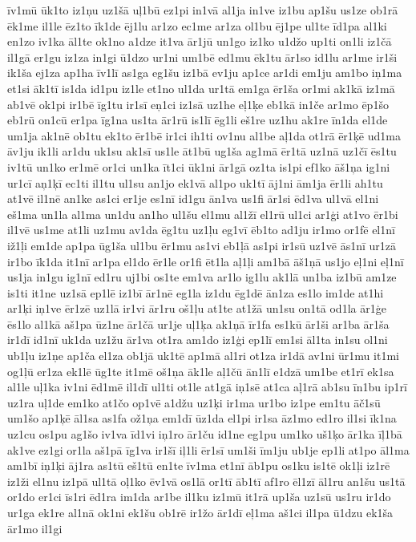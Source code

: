 {īv1mū
ūk1to
iz1ņu
uz1šā
uļ1bū
ez1pi
in1vā
al1ja
in1ve
iz1bu
ap1šu
us1ze
ob1rā
ēk1me
il1le
ēz1to
īk1de
ēj1lu
ar1zo
ec1me
ar1za
ol1bu
ēj1pe
ul1te
īd1pa
al1ki
en1zo
iv1ka
āl1te
ok1no
a1dze
it1va
ār1jū
un1go
iz1ko
u1džo
up1ti
on1li
iz1čā
il1gā
er1gu
iz1za
in1gi
ū1dzo
ur1ni
um1bē
ed1mu
ēk1tu
ār1so
id1lu
ar1me
ir1ši
ik1ša
ej1za
ap1ha
īv1lī
as1ga
eg1šu
iz1bā
ev1ju
ap1ce
ar1di
em1ju
am1bo
iņ1ma
et1si
āk1tī
is1da
id1pu
iz1le
et1no
ul1da
ur1tā
em1ga
ēr1ša
or1mi
ak1kā
iz1mā
ab1vē
ok1pi
ir1bē
īg1tu
ir1sī
eņ1ci
iz1sā
uz1he
eļ1ķe
eb1kā
in1če
ar1mo
ēp1šo
eb1rū
on1cū
er1pa
īg1na
us1ta
ār1rū
is1lī
ēg1li
eš1re
uz1hu
ak1re
īn1da
el1de
um1ja
ak1nē
ob1tu
ek1to
ēr1bē
ir1ci
ih1ti
ov1nu
al1be
aļ1da
ot1rā
ēr1ķē
ud1ma
āv1ju
ik1li
ar1du
uk1su
ak1sī
us1le
āt1bū
ug1ša
ag1mā
ēr1tā
uz1nā
uz1čī
ēs1tu
iv1tū
un1ko
er1mē
or1ci
un1ka
īt1ci
ūk1ni
ār1gā
oz1ta
is1pi
ef1ko
āš1ņa
ig1ni
ur1cī
aņ1ķī
ec1ti
il1tu
ul1su
an1jo
ek1vā
al1po
uk1tī
āj1ni
ām1ja
ēr1li
ah1tu
at1vē
il1nē
an1ke
as1ci
er1je
es1nī
id1gu
ān1va
us1fi
ār1si
ēd1va
ul1vā
el1ni
eš1ma
un1la
al1ma
un1du
an1ho
ul1šu
el1mu
al1žī
el1rū
ul1ci
ar1ģi
at1vo
ēr1bi
il1vē
us1me
at1li
uz1mu
av1da
ēg1tu
uz1ļu
eg1vī
ēb1to
ad1ju
ir1mo
or1fē
el1nī
iž1ļi
em1de
ap1pa
ūg1ša
ul1bu
ēr1mu
as1vi
eb1ļā
as1pi
ir1sū
uz1vē
ās1nī
ur1zā
ir1bo
īk1da
it1nī
ar1pa
el1do
ēr1le
or1fi
ēt1la
aļ1ļi
am1bā
āš1ņā
us1jo
eļ1ni
eļ1nī
us1ja
in1gu
ig1nī
ed1ru
uj1bi
os1te
em1va
ar1lo
ig1lu
ak1lā
un1ba
iz1bū
am1ze
is1ti
it1ne
uz1sā
ep1lē
iz1bī
ār1nē
eg1la
iz1du
ēg1dē
ān1za
es1lo
im1de
at1hi
ar1ķi
iņ1ve
ēr1zē
uz1lā
ir1vi
ār1ru
oš1ļu
at1te
at1žā
un1su
on1tā
od1la
ār1ģe
ēs1lo
al1kā
aš1pa
ūz1ne
ār1čā
ur1je
uļ1ķa
ak1ņā
īr1fa
es1kū
ār1ši
ar1ba
ār1ša
ir1dī
id1nī
uk1da
uz1žu
ār1va
ot1ra
am1do
iz1ģi
ep1lī
em1si
āl1ta
in1su
ol1ni
ub1ļu
iz1ņe
ap1ča
el1za
ob1jā
uk1tē
ap1mā
al1ri
ot1za
ir1dā
av1ni
ūr1mu
it1mi
og1ļū
er1za
ek1lē
ūg1te
it1mē
oš1ņa
āk1le
aļ1čū
ān1lī
e1dzā
um1be
et1rī
ek1sa
al1le
uļ1ka
iv1ni
ēd1mē
il1dī
ul1ti
ot1le
at1gā
iņ1sē
at1ca
aļ1rā
ab1su
īn1bu
ip1rī
uz1ra
uļ1de
em1ko
at1čo
op1vē
a1džu
uz1ķi
ir1ma
ur1bo
iz1pe
em1tu
āč1sū
um1šo
ap1ķē
āl1sa
as1fa
ož1ņa
em1dī
ūz1da
el1pi
ir1sa
āz1mo
ed1ro
il1si
īk1na
uz1cu
os1pu
ag1šo
iv1va
īd1vi
iņ1ro
ār1ču
id1ne
eg1pu
um1ko
uš1ķo
ār1ka
īļ1bā
ak1ve
ez1gi
or1la
aš1pā
īg1va
ir1šī
iļ1li
ēr1sī
um1ši
īm1ju
ub1je
ep1li
at1po
āl1ma
am1bī
iņ1ķi
āj1ra
as1tū
eš1tū
en1te
īv1ma
et1nī
āb1pu
os1ku
is1tē
ok1ļi
iz1rē
iz1ži
el1nu
iz1pā
ul1tā
oļ1ko
ēv1vā
os1lā
or1tī
āb1tī
af1ro
ēl1zī
āl1ru
an1šu
us1tā
or1do
er1ci
īs1ri
ēd1ra
im1da
ar1be
il1ku
iz1mū
it1rā
up1ša
uz1sū
us1ru
ir1do
ur1ga
ek1re
al1nā
ok1ni
ek1šu
ob1rē
ir1žo
ār1dī
eļ1ma
aš1ci
il1pa
ū1dzu
ek1ša
ār1mo
il1gi
}
